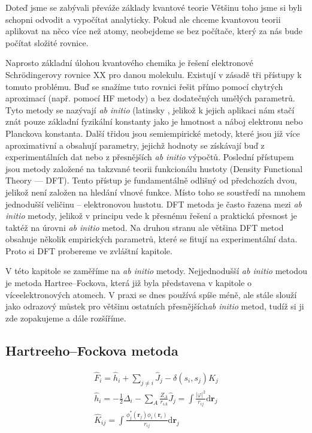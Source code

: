 Doteď jsme se zabývali převáže základy kvantové teorie 
Většinu toho jsme si byli schopni odvodit a vypočítat analyticky. 
Pokud ale chceme kvantovou teorii aplikovat na něco více než atomy,
neobejdeme se bez počítače, který za nás bude počítat složité rovnice.

Naprosto základní úlohou kvantového chemika je řešení elektronové Schr\"{o}dingerovy rovnice XX pro danou molekulu. Existují v zásadě tři přístupy k tomuto problému. Buď se snažíme tuto rovnici řešit přímo pomocí chytrých aproximací (např. pomocí HF metody) a bez dodatečných umělých parametrů. Tyto metody se nazývají \textit{ab initio} (latinsky , jelikož k jejich aplikaci nám stačí znát pouze základní fyzikální konstanty jako je hmotnost a náboj elektronu nebo Planckova konstanta. Další třidou jsou semiempirické metody, které jsou již více aproximativní a obsahují parametry, jejichž hodnoty se získávají buď z experimentálních dat nebo z přesnějších \textit{ab initio} výpočtů. Poslední přístupem jsou metody založené na takzvané teorii funkcionálu hustoty (Density Functional Theory --- DFT). Tento přístup je fundamentálně odlišný od předchozích dvou, jelikož není založen na hledání vlnové funkce. Místo toho se soustředí na mnohem jednodušší veličinu -- elektronovou hustotu. DFT metoda je často řazena mezi \textit{ab initio} metody, jelikož v principu vede k přesnému řešení a praktická přesnost je taktéž na úrovni \textit{ab initio} metod. Na druhou stranu ale většina DFT metod obsahuje několik empirických parametrů, které se fitují na experimentální data. Proto si DFT probereme ve zvláštní kapitole.  

V této kapitole se zaměříme na \textit{ab initio} metody.
Nejjednodušší \textit{ab initio} metodou je metoda Hartree--Fockova, která již byla představena v kapitole o víceelektronových atomech. V praxi se dnes používá spíše méně, ale stále slouží jako odrazový můstek pro většinu ostatních přesnějších\textit{ab initio} metod, tudíž si ji zde zopakujeme a dále rozšíříme.

\subsection{Hartreeho--Fockova metoda}

\begin{eqnarray}
\hat{F}_i = \hat{h}_i+\sum_{j\neq i} \hat{J}_j - \delta(s_i,s_j) \hat{K}_j \\
\hat{h}_i = -\frac{1}{2}\Delta_i - \sum_{A}\frac{Z_A}{r_{iA}}
\hat{J}_j=\int \frac{|\varphi |^2}{r_{ij}}\mathrm{d}\textbf{r}_j \\
\hat{K}_{ij} = \int \frac{\phi_j^*(\mathbf{r}_j)\phi_i(\mathbf{r}_i)}{r_{ij}}\mathrm{d}\textbf{r}_j
\end{eqnarray}

